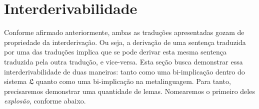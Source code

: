 \section{Interderivabilidade}

Conforme afirmado anteriormente, ambas as traduções apresentadas gozam de propriedade da interderivação.
Ou seja, a derivação de uma sentença traduzida por uma das traduções implica que se pode derivar esta mesma sentença traduzida pela outra tradução, e vice-versa.
Esta seção busca demonstrar essa interderivabilidade de duas maneiras: tanto como uma bi-implicação dentro do sistema $\mathfrak{L}$ quanto como uma bi-implicação na metalinguagem.
Para tanto, precisaremos demonstrar uma quantidade de lemas.
Nomearemos o primeiro deles \emph{explosão}, conforme abaixo.

\vspace{.5\baselineskip}
